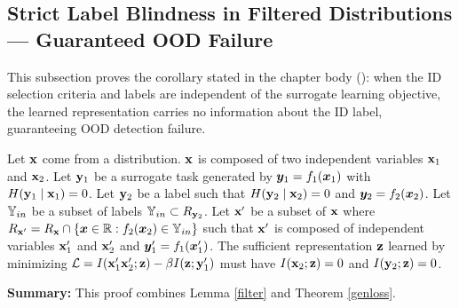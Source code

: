 \subsection{Strict Label Blindness in Filtered Distributions --- Guaranteed OOD Failure}
\label{app:failood}

This subsection proves the corollary stated in the chapter body (): when the ID selection criteria and labels are independent of the surrogate learning objective, the learned representation carries no information about the ID label, guaranteeing OOD detection failure.

\begin{corollary}
Let ${\mathbf{x}}$ come from a distribution. ${\mathbf{x}}$ is composed of two independent variables ${\mathbf{x}}_1$ and ${\mathbf{x}}_2$. Let ${\mathbf{y}}_1$ be a surrogate task generated by ${\bm{y}}_1 = f_1({\bm{x}}_1)$ with $H({\mathbf{y}}_1 \mid {\mathbf{x}}_1) = 0$. Let ${\mathbf{y}}_2$ be a label such that $H({\mathbf{y}}_2 \mid {\mathbf{x}}_2) = 0$ and ${\bm{y}}_2 = f_2({\bm{x}}_2)$. Let ${\mathbb{Y}}_{in}$ be a subset of labels ${\mathbb{Y}}_{in} \subset R_{{\mathbf{y}}_2}$. Let ${\mathbf{x}}'$ be a subset of ${\mathbf{x}}$ where $R_{{\mathbf{x}}'} = R_{{\mathbf{x}}} \cap \{{\bm{x}} \in \mathbb{R}: f_2({\bm{x}}_2) \in {\mathbb{Y}}_{in} \}$ such that ${\mathbf{x}}'$ is composed of independent variables ${\mathbf{x}}_1'$ and ${\mathbf{x}}_2'$ and ${\bm{y}}_1' = f_1({\bm{x}}_1')$. The sufficient representation ${\mathbf{z}}$ learned by minimizing $\mathcal{L} = I({\mathbf{x}}_1' {\mathbf{x}}_2'; {\mathbf{z}}) - \beta I({\mathbf{z}};{\mathbf{y}}_1')$ must have $I({\mathbf{x}}_2;{\mathbf{z}}) = 0$ and $I({\mathbf{y}}_2;{\mathbf{z}}) = 0$.
\label{failood}
\end{corollary}

\textbf{Summary:} This proof combines Lemma \ref{filter} and Theorem \ref{genloss}.

